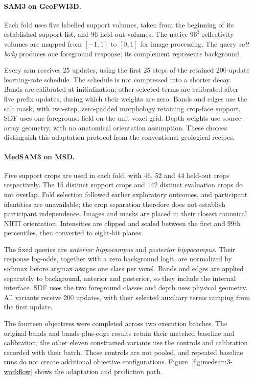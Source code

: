 \documentclass[12pt,a4paper]{article}
\begin{document}
\paragraph{SAM3 on GeoFWI3D.}\label{sec:sam3-methods}
Each fold uses five labelled support volumes, taken from the beginning
of its established support list, and 96 held-out volumes. The native
$96^3$ reflectivity volumes are mapped from $[-1,1]$ to $[0,1]$ for
image processing. The query \emph{salt body} produces one foreground
response; its complement represents background.

Every arm receives 25 updates, using the first 25 steps of the retained
200-update learning-rate schedule. The schedule is not compressed into
a shorter decay. Bands are calibrated at initialization; other selected
terms are calibrated after five prefix updates, during which their
weights are zero. Bands and edges use the salt mask, with two-step,
zero-padded morphology retaining crop-face support. SDF uses one
foreground field on the unit voxel grid. Depth weights use source-array
geometry, with no anatomical orientation assumption. These choices
distinguish this adaptation protocol from the conventional geological
recipes.

\paragraph{MedSAM3 on MSD.}\label{sec:medsam-methods}
Five support crops are used in each fold, with 46, 52 and 44 held-out
crops respectively. The 15 distinct support crops and 142 distinct
evaluation crops do not overlap. Fold selection followed earlier
exploratory outcomes, and participant identities are unavailable; the
crop separation therefore does not establish participant independence.
Images and masks are placed in their closest canonical NIfTI
orientation. Intensities are clipped and scaled between the first and
99th percentiles, then converted to eight-bit planes.

The fixed queries are \emph{anterior hippocampus} and
\emph{posterior hippocampus}. Their response log-odds, together with a
zero background logit, are normalized by softmax before argmax assigns
one class per voxel. Bands and edges are applied separately to
background, anterior and posterior, so they include the internal
interface. SDF uses the two foreground classes and depth uses physical
geometry. All variants receive 200 updates, with their selected
auxiliary terms ramping from the first update.

The fourteen objectives were completed across two execution batches.
The original bands and bands-plus-edge results retain their matched
baseline and calibration; the other eleven constrained variants use
the controls and calibration recorded with their batch. Those controls
are not pooled, and repeated baseline runs do not create additional
objective configurations.
Figure~\ref{fig:medsam3-workflow} shows the adaptation and prediction
path.
\end{document}
